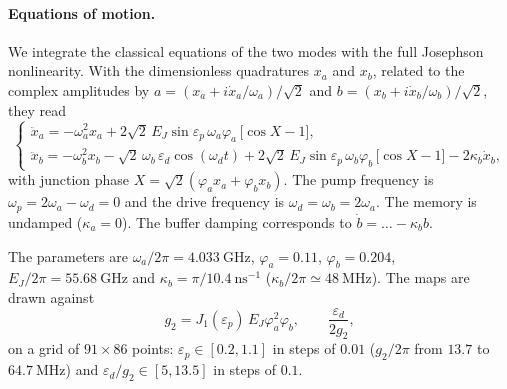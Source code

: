 \documentclass[aps,prx,reprint,floatfix,amsmath,amssymb,longbibliography]{revtex4-2}
\begin{document}
\paragraph*{Equations of motion.}
We integrate the classical equations of the two modes with the full Josephson nonlinearity. With the dimensionless quadratures $x_a$ and $x_b$, related to the complex amplitudes by $a = (x_a + i\dot x_a/\omega_a)/\sqrt2$ and $b = (x_b + i\dot x_b/\omega_b)/\sqrt2$, they read
\begin{equation}
\begin{cases}
    \ddot x_a = -\omega_a^2 x_a + 2\sqrt2\,E_J\sin\varepsilon_p\,\omega_a\varphi_a\,\bigl[\cos X - 1\bigr],\\
    \ddot x_b = -\omega_b^2 x_b - \sqrt2\,\omega_b\,\varepsilon_d\cos(\omega_d t) + 2\sqrt2\,E_J\sin\varepsilon_p\,\omega_b\varphi_b\,\bigl[\cos X - 1\bigr] - 2\kappa_b\dot x_b,
\end{cases}
\label{eq:app_lyap_eom}
\end{equation}
with junction phase $X = \sqrt2(\varphi_a x_a + \varphi_b x_b)$. The pump frequency is $\omega_p = 2\omega_a - \omega_d = 0$ and the drive frequency is $\omega_d = \omega_b = 2\omega_a$. The memory is undamped ($\kappa_a = 0$). The buffer damping corresponds to $\dot b = \dots - \kappa_b b$.

The parameters are $\omega_a/2\pi = 4.033~\mathrm{GHz}$, $\varphi_a = 0.11$, $\varphi_b = 0.204$, $E_J/2\pi = 55.68~\mathrm{GHz}$ and $\kappa_b = \pi/10.4~\mathrm{ns}^{-1}$ ($\kappa_b/2\pi \simeq 48~\mathrm{MHz}$). The maps are drawn against
\begin{equation}
    g_2 = J_1(\varepsilon_p)\,E_J\varphi_a^2\varphi_b, \qquad \frac{\varepsilon_d}{2g_2},
\end{equation}
on a grid of $91\times86$ points: $\varepsilon_p \in [0.2, 1.1]$ in steps of $0.01$ ($g_2/2\pi$ from $13.7$ to $64.7~\mathrm{MHz}$) and $\varepsilon_d/g_2 \in [5, 13.5]$ in steps of $0.1$.
\end{document}
